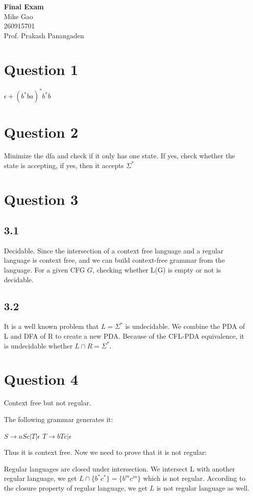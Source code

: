 \documentclass[a4paper, 11pt]{article}
\begin{document}
\noindent
\large\textbf{Final Exam} \hfill \\
\large{Mike Gao} \\
\normalsize 260915701 \\
Prof. Prakash Panangaden \hfill 


\section*{Question 1}
$\epsilon + (b^*ba)^*b^*b$

\section*{Question 2}
Minimize the dfa and check if it only has one state. If yes, check whether the state is accepting, if yes, then it accepts $\Sigma^*$

\section*{Question 3}
\subsection*{3.1}
Decidable. Since the intersection of a context free language and a regular language is context free, and we can build context-free grammar from the language. For a given CFG $G$, checking whether L(G) is empty or not is decidable.
\subsection*{3.2}
It is a well known problem that $L=\Sigma^*$ is undecidable. We combine the PDA of L and DFA of R to create a new PDA. Because of the CFL-PDA equivalence, it is undecidable whether $L \cap R = \Sigma^*$.
\section*{Question 4}
Context free but not regular.

\noindent The following grammar generates it:

$S \rightarrow aSc | T | \epsilon$  $T \rightarrow bTc | \epsilon$

\noindent Thus it is context free. Now we need to prove that it is not regular:

\noindent Regular languages are closed under intersection. We intersect L with another regular language, we get $L \cap \{b^*c^*\} = \{b^mc^m\} $ which is not regular. According to the closure property of regular language, we get $L$ is not regular language as well.
\end{document}
